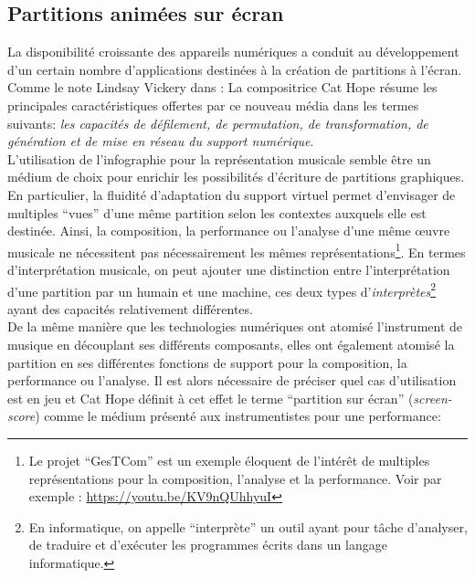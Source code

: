 \subsection{Partitions animées sur écran}

\noindent La disponibilité croissante des appareils numériques a conduit au développement d'un certain nombre d'applications destinées à la création de partitions à l'écran. Comme le note Lindsay Vickery dans \cite{vickery_limitations_2014} :  La compositrice Cat Hope résume les principales caractéristiques offertes par ce nouveau média dans les termes suivants\cite{hope_screen_2011}: \textit{les capacités de défilement, de permutation, de transformation, de génération et de mise en réseau du support numérique}.\\
\indent L'utilisation de l'infographie pour la représentation musicale semble être un médium de choix pour enrichir les possibilités d'écriture de partitions graphiques. En particulier, la fluidité d'adaptation du support virtuel permet d'envisager de multiples ``vues'' d'une même partition selon les contextes auxquels elle est destinée. Ainsi, la composition, la performance ou l'analyse d'une même œuvre musicale ne nécessitent pas nécessairement les mêmes représentations\footnote{Le projet ``GesTCom'' \cite{antoniadis_gesture_2014} est un exemple éloquent de l'intérêt de multiples représentations pour la composition, l'analyse et la performance. Voir par exemple : \url{https://youtu.be/KV9nQUhhyuI}}. En termes d'interprétation musicale, on peut ajouter une distinction entre l'interprétation d'une partition par un humain et une machine, ces deux types d'\textit{interprètes}\footnote{En informatique, on appelle ``interprète'' un outil ayant pour tâche d'analyser, de traduire et d'exécuter les programmes écrits dans un langage informatique.} ayant des capacités relativement différentes.\\
\indent De la même manière que les technologies numériques ont atomisé l'instrument de musique en découplant ses différents composants, elles ont également atomisé la partition en ses différentes fonctions de support pour la composition, la performance ou l'analyse. Il est alors nécessaire de préciser quel cas d'utilisation est en jeu et Cat Hope définit à cet effet le terme ``partition sur écran'' (\textit{screen-score}) \cite{hope_screen_2011} comme le médium présenté aux instrumentistes pour une performance: \\

